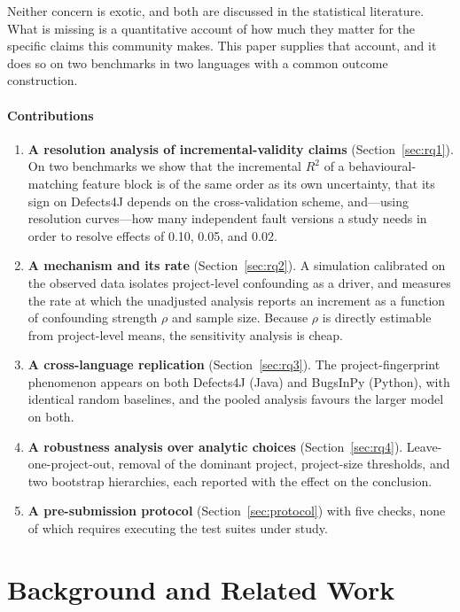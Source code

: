 \documentclass[preprint,12pt]{elsarticle}
\begin{document}
Neither concern is exotic, and both are discussed in the statistical
literature. What is missing is a quantitative account of how much they
matter for the specific claims this community makes. This paper supplies
that account, and it does so on two benchmarks in two languages with a
common outcome construction.

\paragraph{Contributions}
\begin{enumerate}
\item \textbf{A resolution analysis of incremental-validity claims}
(Section~\ref{sec:rq1}). On two benchmarks we show that the incremental
$R^2$ of a behavioural-matching feature block is of the same order as its
own uncertainty, that its sign on Defects4J depends on the cross-validation
scheme, and---using resolution curves---how many independent fault versions a study needs in order to resolve effects of
\num{0.10}, \num{0.05}, and \num{0.02}.
\item \textbf{A mechanism and its rate} (Section~\ref{sec:rq2}). A
simulation calibrated on the observed data isolates project-level
confounding as a driver, and measures the rate at which the unadjusted
analysis reports an increment as a function of confounding strength $\rho$
and sample size. Because $\rho$ is directly estimable from project-level
means, the sensitivity analysis is cheap.
\item \textbf{A cross-language replication} (Section~\ref{sec:rq3}). The
project-fingerprint phenomenon appears on both Defects4J (Java) and
BugsInPy (Python), with identical random baselines, and the pooled analysis
favours the larger model on both.
\item \textbf{A robustness analysis over analytic choices}
(Section~\ref{sec:rq4}). Leave-one-project-out, removal of the dominant
project, project-size thresholds, and two bootstrap hierarchies, each
reported with the effect on the conclusion.
\item \textbf{A pre-submission protocol} (Section~\ref{sec:protocol}) with
five checks, none of which requires executing the test suites under study.
\end{enumerate}

\section{Background and Related Work}
\label{sec:related}
\end{document}
